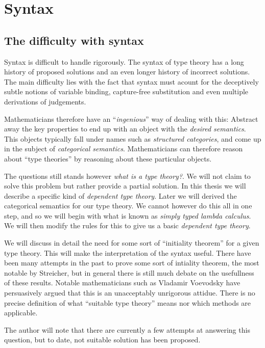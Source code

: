 
\section{Syntax}

\subsection{The difficulty with syntax}
Syntax is difficult to handle rigorously. The syntax of type theory has a long history of proposed solutions and an even longer history of incorrect solutions. The main difficulty lies with the fact that syntax must acount for the deceptively subtle notions of variable binding, capture-free substitution and even multiple derivations of judgements.

Mathematicians therefore have an ``\emph{ingenious}'' way of dealing with this: Abstract away the key properties to end up with an object with the \emph{desired semantics}. This objects typically fall under names such as \emph{structured categories}, and come up in the subject of \emph{categorical semantics}. Mathematicians can therefore reason about ``type theories'' by reasoning about these particular objects.

The questions still stands however \emph{what is a type theory?}. We will not claim to solve this problem but rather provide a partial solution. In this thesis we will describe a specific kind of \emph{dependent type theory}. Later we will derived the categorical semantics for our type theory. We cannot however do this all in one step, and so we will begin with what is known as \emph{simply typed lambda calculus}. We will then modify the rules for this to give us a basic \emph{dependent type theory}.

We will discuss in detail the need for some sort of ``initiality theorem'' for a given type theory. This will make the interpretation of the syntax useful. There have been many attempts in the past to prove some sort of intiality theorem, the most notable by Streicher, but in general there is still much debate on the usefullness of these results. Notable mathematicians such as Vladamir Voevodsky have persuasively argued that this is an unacceptably unrigorous attidue. There is no precise definition of what ``suitable type theory'' means nor which methods are applicable.

The author will note that there are currently a few attempts at answering this question, but to date, not suitable solution has been proposed.

